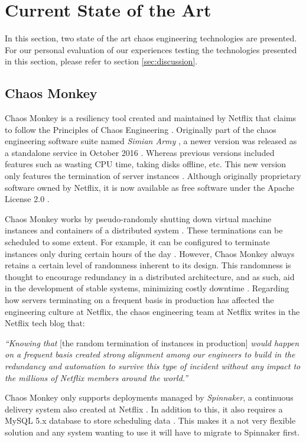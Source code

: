 \documentclass{article}
\begin{document}
\section{Current State of the Art}
\label{sec:stateoftheart}

In this section, two state of the art chaos engineering technologies are presented. For our personal evaluation of our experiences testing the technologies presented in this section, please refer to section \ref{sec:discussion}. 

\subsection{Chaos Monkey}

Chaos Monkey is a resiliency tool created and maintained by Netflix that claims to follow the Principles of Chaos Engineering \cite{chaosmonkeyrepo}\cite{principlesOfChaos}. Originally part of the chaos engineering software suite named \textit{Simian Army} \cite{simianrepo}, a newer version was released as a standalone service in October 2016 \cite{chaosMonkeyUpgraded}. Whereas previous versions included features such as wasting CPU time, taking disks offline, etc. This new version only features the termination of server instances \cite{chaosMonkeyUpgraded}. Although originally proprietary software owned by Netflix, it is now available as free software under the Apache License 2.0 \cite{chaosmonkeyrepo}. 

Chaos Monkey works by pseudo-randomly shutting down virtual machine instances and containers of a distributed system \cite{chaosmonkeyrepo}. These terminations can be scheduled to some extent. For example, it can be configured to terminate instances only during certain hours of the day \cite{chaosMonkeyManual}. However, Chaos Monkey always retains a certain level of randomness inherent to its design. This randomness is thought to encourage redundancy in a distributed architecture, and as such, aid in the development of stable systems, minimizing costly downtime \cite{chaosMonkeyGuide}. Regarding how servers terminating on a frequent basis in production has affected the engineering culture at Netflix, the chaos engineering team at Netflix writes in the Netflix tech blog that:
\begin{displayquote}
\textit{``Knowing that} [the random termination of instances in production] \textit{would happen on a frequent basis created strong alignment among our engineers to build in the redundancy and automation to survive this type of incident without any impact to the millions of Netflix members around the world.''} \cite{chaosMonkeyUpgraded}
\end{displayquote}
Chaos Monkey only supports deployments managed by \textit{Spinnaker}, a continuous delivery system also created at Netflix \cite{chaosMonkeyManual}. In addition to this, it also requires a MySQL 5.x database to store scheduling data \cite{chaosMonkeyManual}. This makes it a not very flexible solution and any system wanting to use it will have to migrate to Spinnaker first.
\end{document}
